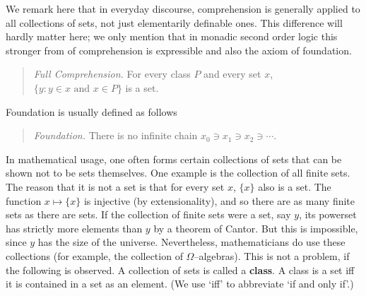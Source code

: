 We remark here that in everyday discourse, comprehension is
generally applied to all collections of sets, not just elementarily
definable ones. This difference will hardly matter here; we only
mention that in monadic second order logic this stronger from of 
comprehension is expressible and also the axiom of foundation.
\begin{quote}
{\sl Full Comprehension.} For every class $P$ and every set $x$, 
$\{y : y \in x \text{ and }x \in P\}$ is a set.
\end{quote}
Foundation is usually defined as follows 
\begin{quote}
{\sl Foundation.} There is no infinite
chain $x_0 \ni x_1 \ni  x_2 \ni \dotsb$.
\end{quote}
In mathematical usage, one often forms certain collections of
sets that can be shown not to be sets themselves. One example
is the collection of all finite sets. The reason that it is not a
set is that for every set $x$, $\{x\}$ also is a set. The
function $x \mapsto \{x\}$ is injective (by extensionality), and so
there are as many finite sets as there are sets. If the collection of
finite sets were a set, say $y$, its powerset has strictly more elements
than $y$ by a theorem of Cantor. But this is impossible, since $y$
has the size of the universe. Nevertheless, mathematicians do use these
collections (for example, the collection of $\Omega$--algebras).
This is not a problem, if the following is observed. A collection 
of sets is called a \textbf{class}. %
A class is a set iff it is contained in a set as an element. (We 
use `iff' to abbreviate `if and only if'.)

